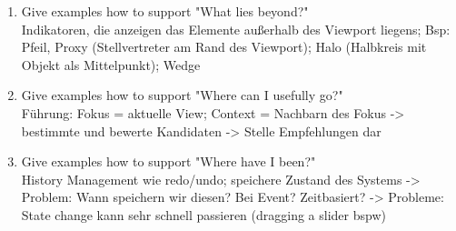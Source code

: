 \begin{enumerate}
	\item Give examples how to support "What lies beyond?"\\
	Indikatoren, die anzeigen das Elemente außerhalb des Viewport liegens; Bsp: Pfeil, Proxy (Stellvertreter am Rand des Viewport); Halo (Halbkreis mit Objekt als Mittelpunkt); Wedge	
	
	\item Give examples how to support "Where can I usefully go?"\\
	Führung: Fokus = aktuelle View; Context = Nachbarn des Fokus -> bestimmte und bewerte Kandidaten -> Stelle Empfehlungen dar
	
	\item Give examples how to support "Where have I been?"\\
	History Management wie redo/undo; speichere Zustand des Systems -> Problem: Wann speichern wir diesen? Bei Event? Zeitbasiert? -> Probleme: State change kann sehr schnell passieren (dragging a slider bspw) 
\end{enumerate}


